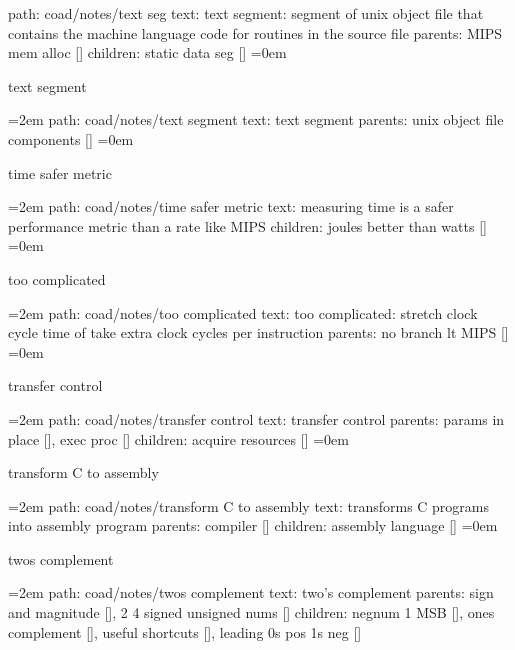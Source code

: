 path: coad/notes/text seg
\smallskip
text:  text segment: segment of unix object file that contains the machine language code for routines in the source file
\smallskip
parents:  MIPS mem alloc []
\smallskip
children: static data seg []
\smallskip
\leftskip=0em
\par\endgroup
\bigskip
{}
text segment
\smallskip
\par\begingroup
\leftskip=2em
path: coad/notes/text segment
\smallskip
text:  text segment
\smallskip
parents:  unix object file components []
\smallskip
\leftskip=0em
\par\endgroup
\bigskip
{}
time safer metric
\smallskip
\par\begingroup
\leftskip=2em
path: coad/notes/time safer metric
\smallskip
text:  measuring time is a safer performance metric than a rate like MIPS
\smallskip
children: joules better than watts []
\smallskip
\leftskip=0em
\par\endgroup
\bigskip
{}
too complicated
\smallskip
\par\begingroup
\leftskip=2em
path: coad/notes/too complicated
\smallskip
text:  too complicated: stretch clock cycle time of take extra clock cycles per instruction
\smallskip
parents:  no branch lt MIPS []
\smallskip
\leftskip=0em
\par\endgroup
\bigskip
{}
transfer control
\smallskip
\par\begingroup
\leftskip=2em
path: coad/notes/transfer control
\smallskip
text:  transfer control
\smallskip
parents:  params in place [], exec proc []
\smallskip
children: acquire resources []
\smallskip
\leftskip=0em
\par\endgroup
\bigskip
{}
transform C to assembly
\smallskip
\par\begingroup
\leftskip=2em
path: coad/notes/transform C to assembly
\smallskip
text:  transforms C programs into assembly program
\smallskip
parents:  compiler []
\smallskip
children: assembly language []
\smallskip
\leftskip=0em
\par\endgroup
\bigskip
{}
twos complement
\smallskip
\par\begingroup
\leftskip=2em
path: coad/notes/twos complement
\smallskip
text:  two's complement
\smallskip
parents:  sign and magnitude [], 2 4 signed unsigned nums []
\smallskip
children: negnum 1 MSB [], ones complement [], useful shortcuts [], leading 0s pos 1s neg []

